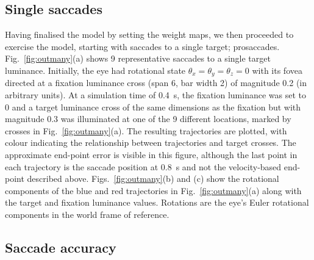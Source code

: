 \documentclass{frontiersSCNS}
\begin{document}
\subsection{Single saccades} \label{sec:singlesaccades}

Having finalised the model by setting the weight maps, we then proceeded
to exercise the model, starting with saccades to a single target;
prosaccades. Fig.~\ref{fig:outmany}(a) shows 9 representative saccades
to a single
target luminance. Initially, the eye had rotational state
$\theta_x=\theta_y=\theta_z=0$ with its fovea directed at a
fixation luminance cross (span 6\dg, bar width 2\dg) of
magnitude 0.2 (in arbitrary units). At a
simulation time of 0.4~s, the fixation luminance was set to 0 and
a target luminance cross of the same dimensions as the fixation but with
magnitude 0.3 was illuminated at one of the
9 different locations, marked by crosses in Fig.~\ref{fig:outmany}(a).
The resulting trajectories are plotted, with colour indicating the
relationship between trajectories and target crosses. The approximate
end-point error is visible in this figure, although the last point in
each trajectory is the saccade position at 0.8~s and not the
velocity-based end-point described above. Figs.~\ref{fig:outmany}(b) and (c)
show the rotational components of the blue and red trajectories
in Fig.~\ref{fig:outmany}(a) along with the target and fixation
luminance values. Rotations are the eye's Euler rotational components
in the world frame of reference.

\subsection{Saccade accuracy}
\end{document}
